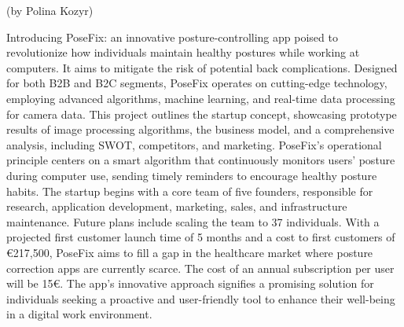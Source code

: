 (by Polina Kozyr)

\p
Introducing PoseFix: an innovative posture-controlling app poised to revolutionize how individuals maintain healthy postures while working at computers. It aims to mitigate the risk of potential back complications. Designed for both B2B and B2C segments, PoseFix operates on cutting-edge technology, employing advanced algorithms, machine learning, and real-time data processing for camera data.
This project outlines the startup concept, showcasing prototype results of image processing algorithms, the business model, and a comprehensive analysis, including SWOT, competitors, and marketing. PoseFix's operational principle centers on a smart algorithm that continuously monitors users' posture during computer use, sending timely reminders to encourage healthy posture habits.
The startup begins with a core team of five founders, responsible for research, application development, marketing, sales, and infrastructure maintenance. Future plans include scaling the team to 37 individuals. With a projected first customer launch time of 5 months and a cost to first customers of €217,500, PoseFix aims to fill a gap in the healthcare market where posture correction apps are currently scarce. The cost of an annual subscription per user will be 15€. The app's innovative approach signifies a promising solution for individuals seeking a proactive and user-friendly tool to enhance their well-being in a digital work environment.
